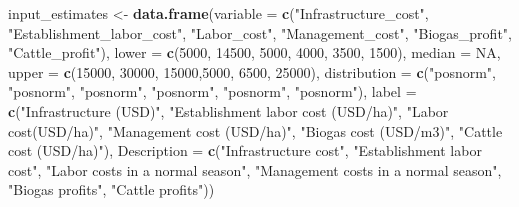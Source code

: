 \documentclass[
]{article}
\newenvironment{Shaded}{\begin{snugshade}}{\end{snugshade}}
\newcommand{\AttributeTok}[1]{\textcolor[rgb]{0.13,0.29,0.53}{#1}}
\newcommand{\ConstantTok}[1]{\textcolor[rgb]{0.56,0.35,0.01}{#1}}
\newcommand{\DecValTok}[1]{\textcolor[rgb]{0.00,0.00,0.81}{#1}}
\newcommand{\FunctionTok}[1]{\textcolor[rgb]{0.13,0.29,0.53}{\textbf{#1}}}
\newcommand{\NormalTok}[1]{#1}
\newcommand{\OtherTok}[1]{\textcolor[rgb]{0.56,0.35,0.01}{#1}}
\newcommand{\StringTok}[1]{\textcolor[rgb]{0.31,0.60,0.02}{#1}}
\begin{document}
\begin{Shaded}
\begin{Highlighting}[]
\NormalTok{input\_estimates }\OtherTok{\textless{}{-}} \FunctionTok{data.frame}\NormalTok{(}\AttributeTok{variable =} \FunctionTok{c}\NormalTok{(}\StringTok{"Infrastructure\_cost"}\NormalTok{, }\StringTok{"Establishment\_labor\_cost"}\NormalTok{, }\StringTok{"Labor\_cost"}\NormalTok{, }
                                           \StringTok{"Management\_cost"}\NormalTok{, }\StringTok{"Biogas\_profit"}\NormalTok{,}
                                           \StringTok{"Cattle\_profit"}\NormalTok{),}
                              \AttributeTok{lower =} \FunctionTok{c}\NormalTok{(}\DecValTok{5000}\NormalTok{, }\DecValTok{14500}\NormalTok{, }\DecValTok{5000}\NormalTok{, }\DecValTok{4000}\NormalTok{, }\DecValTok{3500}\NormalTok{, }\DecValTok{1500}\NormalTok{),}
                              \AttributeTok{median =} \ConstantTok{NA}\NormalTok{,}
                              \AttributeTok{upper =} \FunctionTok{c}\NormalTok{(}\DecValTok{15000}\NormalTok{, }\DecValTok{30000}\NormalTok{, }\DecValTok{15000}\NormalTok{,}\DecValTok{5000}\NormalTok{, }\DecValTok{6500}\NormalTok{, }\DecValTok{25000}\NormalTok{),}
                              \AttributeTok{distribution =} \FunctionTok{c}\NormalTok{(}\StringTok{"posnorm"}\NormalTok{, }\StringTok{"posnorm"}\NormalTok{, }\StringTok{"posnorm"}\NormalTok{, }
                                               \StringTok{"posnorm"}\NormalTok{, }\StringTok{"posnorm"}\NormalTok{, }\StringTok{"posnorm"}\NormalTok{),}
                              \AttributeTok{label =} \FunctionTok{c}\NormalTok{(}\StringTok{"Infrastructure (USD)"}\NormalTok{, }\StringTok{"Establishment labor cost (USD/ha)"}\NormalTok{, }\StringTok{"Labor cost(USD/ha)"}\NormalTok{,}
                                        \StringTok{"Management cost (USD/ha)"}\NormalTok{, }\StringTok{"Biogas cost (USD/m3)"}\NormalTok{,}
                                        \StringTok{"Cattle cost (USD/ha)"}\NormalTok{),}
                              \AttributeTok{Description =} \FunctionTok{c}\NormalTok{(}\StringTok{"Infrastructure cost"}\NormalTok{,}
                                              \StringTok{"Establishment labor cost"}\NormalTok{,}
                                              \StringTok{"Labor costs in a normal season"}\NormalTok{, }
                                              \StringTok{"Management costs in a normal season"}\NormalTok{,}
                                              \StringTok{"Biogas profits"}\NormalTok{,}
                                              \StringTok{"Cattle profits"}\NormalTok{))}


\end{Highlighting}
\end{Shaded}
\end{document}

